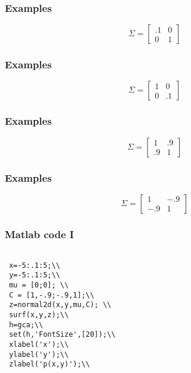 \begin{frame}[fragile]\frametitle{Examples}

$$\Sigma=\begin{bmatrix} .1&0\\0&1 \end{bmatrix}$$

\center{\texttt{[image: g2d2]} } 

\end{frame}


\begin{frame}[fragile]\frametitle{Examples}

$$\Sigma=\begin{bmatrix} 1&0\\0&.1 \end{bmatrix}$$

\center{\texttt{[image: g2d3]} } 

\end{frame}


\begin{frame}[fragile]\frametitle{Examples}

$$\Sigma=\begin{bmatrix} 1&.9\\.9&1 \end{bmatrix}$$

\center{\texttt{[image: g2d4]} } 

\end{frame}

\begin{frame}[fragile]\frametitle{Examples}

$$\Sigma=\begin{bmatrix} 1&-.9\\-.9&1 \end{bmatrix}$$

\center{\texttt{[image: g2d5]} } 

\end{frame}


\begin{frame}[fragile]\frametitle{Matlab code I}



\begin{lstlisting}

 x=-5:.1:5;\\
 y=-5:.1:5;\\
 mu = [0;0]; \\
 C = [1,-.9;-.9,1];\\
 z=normal2d(x,y,mu,C); \\
 surf(x,y,z);\\
 h=gca;\\
 set(h,'FontSize',[20]);\\
 xlabel('x');\\
 ylabel('y');\\
 zlabel('p(x,y)');\\
\end{lstlisting}


\end{frame}


